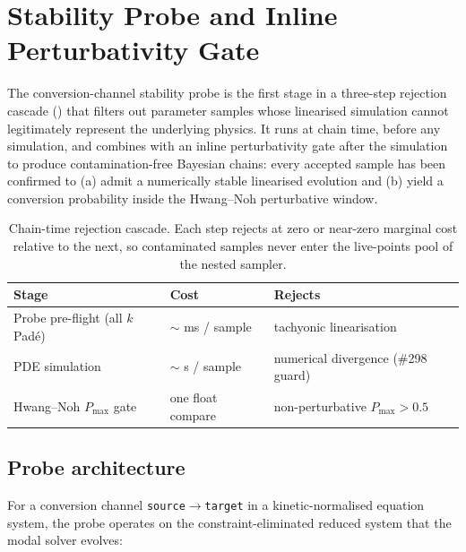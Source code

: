 
\section{Stability Probe and Inline Perturbativity Gate}
\label{sec:stability-probe}

The conversion-channel stability probe is the first stage in a
three-step rejection cascade
() that filters out parameter samples
whose linearised simulation cannot legitimately represent the
underlying physics. It runs at chain time, before any simulation, and
combines with an inline perturbativity gate after the simulation to
produce contamination-free Bayesian chains: every accepted sample has
been confirmed to (a) admit a numerically stable linearised evolution
and (b) yield a conversion probability inside the Hwang--Noh
perturbative window.

\begin{table}[ht]
\centering
\begin{tabular}{lll}
\toprule
\textbf{Stage} & \textbf{Cost} & \textbf{Rejects} \\
\midrule
Probe pre-flight (all $k$ Pad\'e) & $\sim$ ms / sample & tachyonic linearisation \\
PDE simulation & $\sim$ s / sample & numerical divergence (\#298 guard) \\
Hwang--Noh $P_{\max}$ gate & one float compare & non-perturbative $P_{\max} > 0.5$ \\
\bottomrule
\end{tabular}
\caption{Chain-time rejection cascade. Each step rejects at zero or
near-zero marginal cost relative to the next, so contaminated samples
never enter the live-points pool of the nested sampler.}
\label{tab:stability-cascade}
\end{table}

\subsection{Probe architecture}

For a conversion channel \texttt{source}$\rightarrow$\texttt{target}
in a kinetic-normalised equation system, the probe operates on the
constraint-eliminated reduced system that the modal solver evolves:


